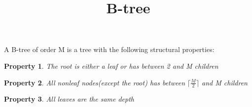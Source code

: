 \documentclass{article}
\title{B-tree}
\newtheorem{Property}{Property}
\begin{document}
\maketitle
A B-tree of order M is a tree with the following structural properties:
\begin{Property}
  The root is either a leaf or has between 2 and M children
\end{Property}
\begin{Property}
  All nonleaf nodes(except the root) has between $\lceil \frac{M}{2} \rceil$ and M children
\end{Property}
\begin{Property}
  All leaves are the same depth
\end{Property}
\end{document}
